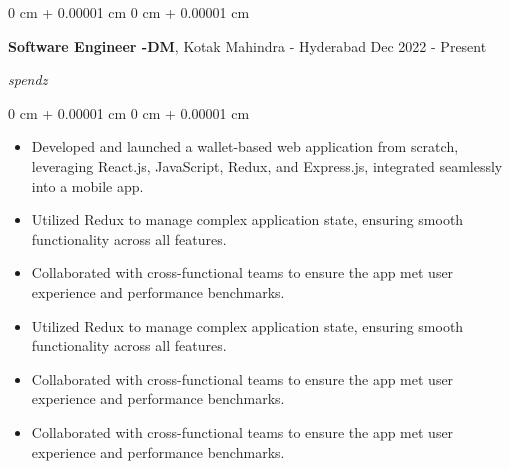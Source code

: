 \documentclass[10pt, letterpaper]{article}
\newenvironment{highlights}{
    \begin{itemize}[
        topsep=0.10 cm,
        parsep=0.10 cm,
        partopsep=0pt,
        itemsep=0pt,
        leftmargin=0 cm + 10pt
    ]
}{
    \end{itemize}
} %
\newenvironment{onecolentry}{
    \begin{adjustwidth}{
        0 cm + 0.00001 cm
    }{
        0 cm + 0.00001 cm
    }
}{
    \end{adjustwidth}
} %
\newenvironment{twocolentry}[2][]{
    \onecolentry
    \def\secondColumn{#2}
    \setcolumnwidth{\fill, 4.5 cm}
    \begin{paracol}{2}
}{
    \switchcolumn \raggedleft \secondColumn
    \end{paracol}
    \endonecolentry
} %
\begin{document}
        \vspace{0.10 cm}


        
        \begin{twocolentry}{
            Dec 2022 - Present
        }
            \textbf{Software Engineer -DM}, Kotak Mahindra - Hyderabad\end{twocolentry}

        \vspace{0.10 cm}
        \textit{spendz}
                \vspace{0.05 cm}

        \begin{onecolentry}
            \begin{highlights}
                \item Developed and launched a wallet-based web application from scratch, leveraging React.js, JavaScript, Redux, and Express.js, integrated seamlessly into a mobile app.
                \item Utilized Redux to manage complex application state, ensuring smooth functionality across all features.
 \item Collaborated with cross-functional teams to ensure the app met user experience and performance benchmarks.
                \item Utilized Redux to manage complex application state, ensuring smooth functionality across all features.
 \item Collaborated with cross-functional teams to ensure the app met user experience and performance benchmarks.
 \item Collaborated with cross-functional teams to ensure the app met user experience and performance benchmarks.
                
            \end{highlights}
        \end{onecolentry}


        \vspace{0.2 cm}

\end{document}
